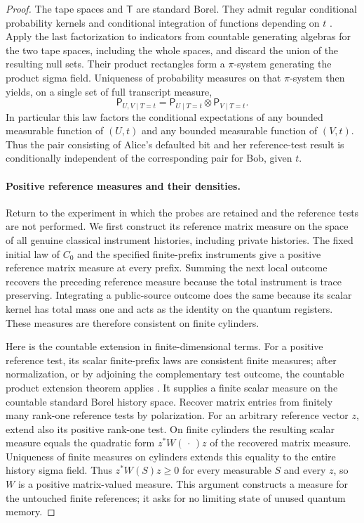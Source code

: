 \begin{proof}
The tape spaces and $\mathsf T$ are standard Borel.  They admit regular
conditional probability kernels and conditional integration of
functions depending on $t$
\cite[Theorems~6.3--6.4]{Kallenberg2002}.  Apply the last factorization
to indicators from countable generating algebras for the two tape spaces,
including the whole spaces, and discard the union of the resulting null
sets.  Their product rectangles form a $\pi$-system generating the product
sigma field.  Uniqueness of probability measures on that $\pi$-system then
yields, on a single set of full transcript measure,
\begin{equation}\label{eq:full-tape-law}
 \mathsf P_{U,V\mid T=t}
 =\mathsf P_{U\mid T=t}\otimes\mathsf P_{V\mid T=t}.
\end{equation}
In particular this law factors the conditional expectations of any
bounded measurable function of $(U,t)$ and any bounded measurable
function of $(V,t)$.  Thus the pair consisting of Alice's defaulted
bit and her reference-test result is conditionally independent of the
corresponding pair for Bob, given $t$.

\paragraph{Positive reference measures and their densities.}
Return to the experiment in which the probes are retained and the
reference tests are not performed.  We first construct its reference
matrix measure on the space of all genuine classical instrument
histories, including private histories.  The fixed initial law of $C_0$
and the specified finite-prefix instruments give a positive reference
matrix measure at every prefix.  Summing the next local outcome recovers
the preceding reference measure because the total instrument is trace
preserving.  Integrating a public-source outcome does the same because
its scalar kernel has total mass one and acts as the identity on the
quantum registers.  These measures are therefore consistent on finite
cylinders.

Here is the countable extension in finite-dimensional terms.  For a
positive reference test, its scalar finite-prefix laws are consistent
finite measures; after normalization, or by adjoining the
complementary test outcome, the countable product extension theorem
applies \cite[Theorem~6.14]{Kallenberg2002}.  It supplies a finite
scalar measure on the countable standard Borel history space.  Recover
matrix entries from finitely many rank-one reference tests by
polarization.  For an arbitrary reference vector $z$, extend also its
positive rank-one test.  On finite cylinders the resulting scalar
measure equals the quadratic form $z^*W(\,\cdot\,)z$ of the recovered
matrix measure.  Uniqueness of finite measures on cylinders extends
this equality to the entire history sigma field.  Thus
$z^*W(S)z\ge0$ for every measurable $S$ and every $z$, so $W$ is a
positive matrix-valued measure.  This argument constructs a measure
for the untouched finite references; it asks for no limiting state of
unused quantum memory.


\end{proof}
